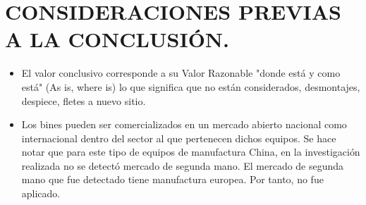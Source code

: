 
\chapter{CONSIDERACIONES PREVIAS A LA CONCLUSIÓN.} %
\begin{itemize}
	\item El valor conclusivo corresponde a su Valor Razonable "donde está y como está" (As is, where is) lo que significa que no están considerados, desmontajes, despiece, fletes a nuevo sitio.
	\item Los bines pueden ser comercializados en un mercado abierto nacional como internacional dentro del sector al que pertenecen dichos equipos.
		Se hace notar que para este tipo de equipos de manufactura China, en la investigación realizada no se detectó mercado de segunda mano.
		El mercado de segunda mano que fue detectado tiene manufactura europea.
		Por tanto, no fue aplicado.
\end{itemize}
